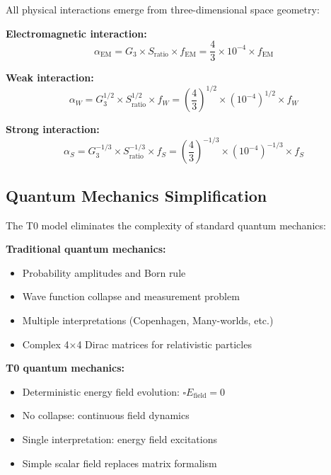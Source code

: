 \documentclass[12pt,a4paper]{report}
\begin{document}
All physical interactions emerge from three-dimensional space geometry:

\textbf{Electromagnetic interaction:}
\begin{equation}
	\alpha_{\text{EM}} = G_3 \times S_{\text{ratio}} \times f_{\text{EM}} = \frac{4}{3} \times 10^{-4} \times f_{\text{EM}}
\end{equation}

\textbf{Weak interaction:}
\begin{equation}
	\alpha_W = G_3^{1/2} \times S_{\text{ratio}}^{1/2} \times f_W = \left(\frac{4}{3}\right)^{1/2} \times (10^{-4})^{1/2} \times f_W
\end{equation}

\textbf{Strong interaction:}
\begin{equation}
	\alpha_S = G_3^{-1/3} \times S_{\text{ratio}}^{-1/3} \times f_S = \left(\frac{4}{3}\right)^{-1/3} \times (10^{-4})^{-1/3} \times f_S
\end{equation}

\subsection{Quantum Mechanics Simplification}
\label{subsec:quantum_mechanics_simplification}

The T0 model eliminates the complexity of standard quantum mechanics:

\textbf{Traditional quantum mechanics:}
\begin{itemize}
	\item Probability amplitudes and Born rule
	\item Wave function collapse and measurement problem
	\item Multiple interpretations (Copenhagen, Many-worlds, etc.)
	\item Complex 4×4 Dirac matrices for relativistic particles
\end{itemize}

\textbf{T0 quantum mechanics:}
\begin{itemize}
	\item Deterministic energy field evolution: $\square E_{\text{field}} = 0$
	\item No collapse: continuous field dynamics
	\item Single interpretation: energy field excitations
	\item Simple scalar field replaces matrix formalism
\end{itemize}
\end{document}
